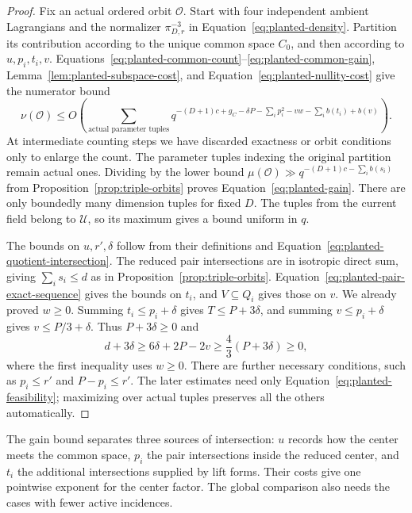 \begin{proof}
Fix an actual ordered orbit $\mathcal O$.  Start with four independent
ambient Lagrangians and the normalizer $\pi_{D,r}^{-3}$ in
Equation~\eqref{eq:planted-density}.  Partition its contribution
according to the unique common space $C_0$, and then according to
$u,p_i,t_i,v$.  Equations~\eqref{eq:planted-common-count}--\eqref{eq:planted-common-gain},
Lemma~\ref{lem:planted-subspace-cost}, and
Equation~\eqref{eq:planted-nullity-cost} give the numerator bound
\[
 \nu(\mathcal O)\le
 O\left(\sum_{\text{actual parameter tuples}}
 q^{-(D+1)c+g_C-\delta P-\sum_i p_i^2-vw
                      -\sum_i b(t_i)+b(v)}\right).
\]
At intermediate counting steps we have discarded exactness or orbit
conditions only to enlarge the count.  The parameter tuples indexing
the original partition remain actual ones.  Dividing by the lower
bound $\mu(\mathcal O)\gg q^{-(D+1)c-\sum_i b(s_i)}$ from
Proposition~\ref{prop:triple-orbits} proves
Equation~\eqref{eq:planted-gain}.  There are only boundedly many
dimension tuples for fixed \(D\). The tuples from the current field
belong to \(\mathcal U\), so its maximum gives a
bound uniform in \(q\).

The bounds on $u,r',\delta$ follow from their definitions and
Equation~\eqref{eq:planted-quotient-intersection}.  The reduced pair
intersections are in isotropic direct sum, giving
$\sum_i s_i\le d$ as in Proposition~\ref{prop:triple-orbits}.
Equation~\eqref{eq:planted-pair-exact-sequence} gives the bounds on
$t_i$, and $V\subseteq Q_i$ gives those on $v$.  We already proved
$w\ge0$.  Summing $t_i\le p_i+\delta$ gives
$T\le P+3\delta$, and summing $v\le p_i+\delta$ gives
$v\le P/3+\delta$.  Thus $P+3\delta\ge0$ and
\[
 d+3\delta\ge 6\delta+2P-2v
       \ge\frac43(P+3\delta)\ge0,
\]
where the first inequality uses $w\ge0$.  There are further
necessary conditions, such as $p_i\le r'$ and $P-p_i\le r'$.
The later estimates need only Equation~\eqref{eq:planted-feasibility};
maximizing over actual tuples preserves all the others automatically.
\end{proof}

The gain bound separates three sources of intersection: $u$ records
how the center meets the common space, $p_i$ the pair intersections
inside the reduced center, and $t_i$ the additional intersections
supplied by lift forms. Their costs give one pointwise exponent for
the center factor. The global comparison also needs the cases with
fewer active incidences.

